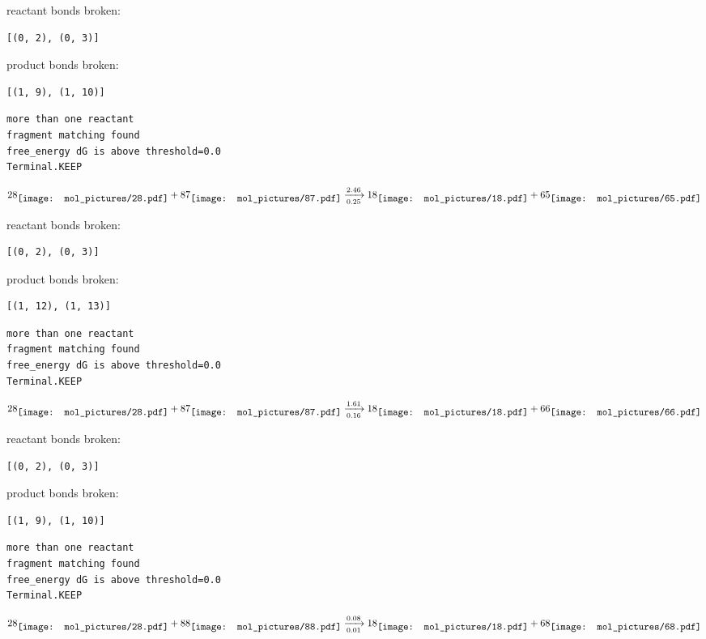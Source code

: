 \documentclass{article}
\begin{document}
reactant bonds broken:\begin{verbatim}
[(0, 2), (0, 3)]
\end{verbatim}
product bonds broken:\begin{verbatim}
[(1, 9), (1, 10)]
\end{verbatim}




\vspace{1cm}
\begin{verbatim}
more than one reactant
fragment matching found
free_energy dG is above threshold=0.0
Terminal.KEEP
\end{verbatim}
$$
28
\raisebox{-.5\height}{\texttt{[image: mol\_pictures/28.pdf]}}
+
87
\raisebox{-.5\height}{\texttt{[image: mol\_pictures/87.pdf]}}
\xrightarrow[0.25]{2.46}
18
\raisebox{-.5\height}{\texttt{[image: mol\_pictures/18.pdf]}}
+
65
\raisebox{-.5\height}{\texttt{[image: mol\_pictures/65.pdf]}}
$$


reactant bonds broken:\begin{verbatim}
[(0, 2), (0, 3)]
\end{verbatim}
product bonds broken:\begin{verbatim}
[(1, 12), (1, 13)]
\end{verbatim}




\vspace{1cm}
\begin{verbatim}
more than one reactant
fragment matching found
free_energy dG is above threshold=0.0
Terminal.KEEP
\end{verbatim}
$$
28
\raisebox{-.5\height}{\texttt{[image: mol\_pictures/28.pdf]}}
+
87
\raisebox{-.5\height}{\texttt{[image: mol\_pictures/87.pdf]}}
\xrightarrow[0.16]{1.61}
18
\raisebox{-.5\height}{\texttt{[image: mol\_pictures/18.pdf]}}
+
66
\raisebox{-.5\height}{\texttt{[image: mol\_pictures/66.pdf]}}
$$


reactant bonds broken:\begin{verbatim}
[(0, 2), (0, 3)]
\end{verbatim}
product bonds broken:\begin{verbatim}
[(1, 9), (1, 10)]
\end{verbatim}




\vspace{1cm}
\begin{verbatim}
more than one reactant
fragment matching found
free_energy dG is above threshold=0.0
Terminal.KEEP
\end{verbatim}
$$
28
\raisebox{-.5\height}{\texttt{[image: mol\_pictures/28.pdf]}}
+
88
\raisebox{-.5\height}{\texttt{[image: mol\_pictures/88.pdf]}}
\xrightarrow[0.01]{0.08}
18
\raisebox{-.5\height}{\texttt{[image: mol\_pictures/18.pdf]}}
+
68
\raisebox{-.5\height}{\texttt{[image: mol\_pictures/68.pdf]}}
$$
\end{document}
